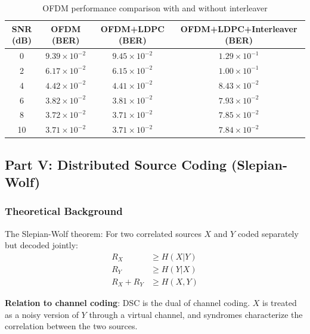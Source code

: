 \documentclass[12pt, a4paper]{article}
\begin{document}
\begin{table}[h]
\centering
\caption{OFDM performance comparison with and without interleaver}
\label{tab:ofdm_en}
\begin{tabular}{c|c|c|c}
\toprule
SNR (dB) & OFDM (BER) & OFDM+LDPC (BER) & OFDM+LDPC+Interleaver (BER) \\
\midrule
 0 & $9.39\times10^{-2}$ & $9.45\times10^{-2}$ & $1.29\times10^{-1}$ \\
 2 & $6.17\times10^{-2}$ & $6.15\times10^{-2}$ & $1.00\times10^{-1}$ \\
 4 & $4.42\times10^{-2}$ & $4.41\times10^{-2}$ & $8.43\times10^{-2}$ \\
 6 & $3.82\times10^{-2}$ & $3.81\times10^{-2}$ & $7.93\times10^{-2}$ \\
 8 & $3.72\times10^{-2}$ & $3.71\times10^{-2}$ & $7.85\times10^{-2}$ \\
10 & $3.71\times10^{-2}$ & $3.71\times10^{-2}$ & $7.84\times10^{-2}$ \\
\bottomrule
\end{tabular}
\end{table}

\subsection{Part V: Distributed Source Coding (Slepian-Wolf)}

\subsubsection{Theoretical Background}

The Slepian-Wolf theorem: For two correlated sources $X$ and $Y$ coded separately but decoded jointly:
\begin{align}
R_X &\geq H(X|Y) \label{eq:sw1_en}\\
R_Y &\geq H(Y|X) \label{eq:sw2_en}\\
R_X + R_Y &\geq H(X,Y) \label{eq:sw3_en}
\end{align}

\textbf{Relation to channel coding}: DSC is the dual of channel coding. $X$ is treated as a noisy version of $Y$ through a virtual channel, and syndromes characterize the correlation between the two sources.
\end{document}
